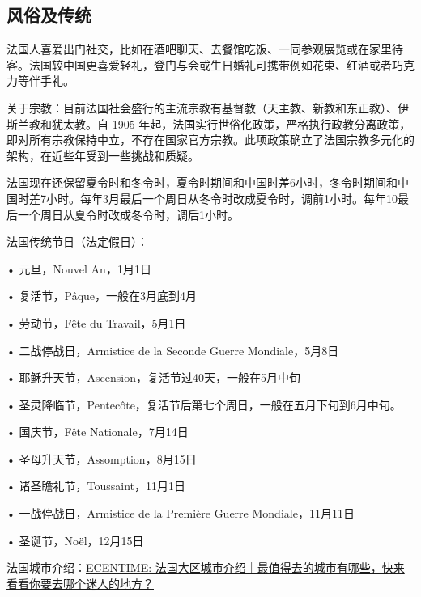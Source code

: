 \subsection{风俗及传统}
法国人喜爱出门社交，比如在酒吧聊天、去餐馆吃饭、一同参观展览或在家里待客。法国较中国更喜爱轻礼，登门与会或生日婚礼可携带例如花束、红酒或者巧克力等伴手礼。

关于宗教：目前法国社会盛行的主流宗教有基督教（天主教、新教和东正教）、伊斯兰教和犹太教。自 1905 年起，法国实行世俗化政策，严格执行政教分离政策，即对所有宗教保持中立，不存在国家官方宗教。此项政策确立了法国宗教多元化的架构，在近些年受到一些挑战和质疑。

法国现在还保留夏令时和冬令时，夏令时期间和中国时差6小时，冬令时期间和中国时差7小时。每年3月最后一个周日从冬令时改成夏令时，调前1小时。每年10最后一个周日从夏令时改成冬令时，调后1小时。

法国传统节日（法定假日）：

• 元旦，Nouvel An，1月1日

• 复活节，Pâque，一般在3月底到4月

• 劳动节，Fête du Travail，5月1日

• 二战停战日，Armistice de la Seconde Guerre Mondiale，5月8日

• 耶稣升天节，Ascension，复活节过40天，一般在5月中旬

• 圣灵降临节，Pentecôte，复活节后第七个周日，一般在五月下旬到6月中旬。

• 国庆节，Fête Nationale，7月14日

• 圣母升天节，Assomption，8月15日

• 诸圣瞻礼节，Toussaint，11月1日

• 一战停战日，Armistice de la Première Guerre Mondiale，11月11日

• 圣诞节，Noël，12月15日

法国城市介绍：\href{https://www.ecentime.com/article/-france-geographie}{ECENTIME: 法国大区城市介绍｜最值得去的城市有哪些，快来看看你要去哪个迷人的地方？} 
